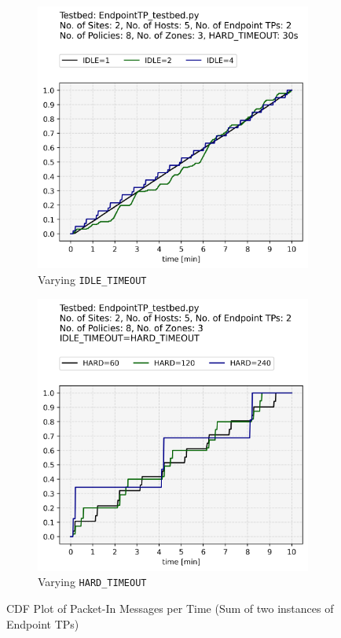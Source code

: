 \begin{figure}[t]
    \centering
    \begin{subfigure}[t]{.22\textwidth}
      \centering
      \includegraphics[width=\linewidth]{img/packet-in_idle_new_cdf.png}
      \caption{Varying \texttt{IDLE\_TIMEOUT}}
      \label{fig:sub: Varying IDLE_TIMEOUT}
    \end{subfigure}\hfill%
    \begin{subfigure}[t]{.22\textwidth}
      \centering
      \includegraphics[width=\linewidth]{img/packet-in_hard_new_cdf.png}
      \caption{Varying \texttt{HARD\_TIMEOUT}}
      \label{fig:sub: Varying HARD_TIMEOUT}
    \end{subfigure}
    \caption{\acs{CDF} Plot of Packet-In Messages per Time (Sum of two instances of Endpoint \acsp{TP})}
    \label{fig:CDF Plot of Packet-In Messages per Time}
\end{figure}


